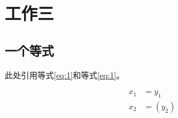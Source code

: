 \chapter{工作三}

\section{一个等式}

此处引用等式\ref{eq:1}和等式\eqref{eq:1}。

\begin{equation}\label{eq:1}
    \begin{array}{ll}
    x_{1} & =y_{1} \\
    x_{2} & =\left(y_{2}\right)
    \end{array}
\end{equation}